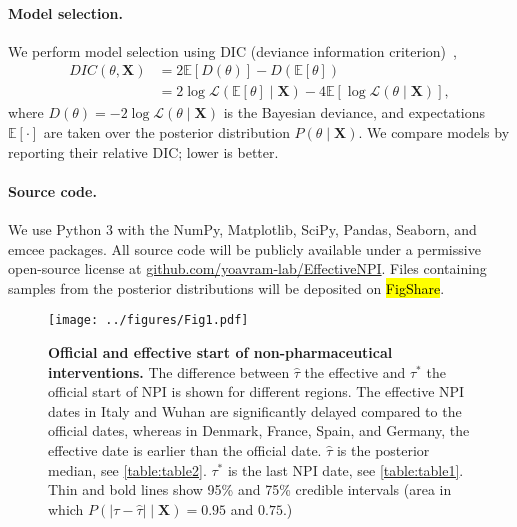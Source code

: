 \documentclass[12pt]{extarticle}
\let\vec\mathbf
\begin{document}
\paragraph*{Model selection.}
We perform model selection using DIC (deviance information criterion)~\citep{Spiegelhalter2002},
\begin{equation} \label{eq:DIC}
\begin{aligned}
DIC(\theta, \vec{X}) &= 2\mathbb{E}[D(\theta)] - D(\mathbb{E}[\theta])   \\
&= 2 \log\mathcal{L}(\mathbb{E}[\theta] \mid \vec{X}) - 4\mathbb{E}[\log\mathcal{L}(\theta \mid \vec{X})],
\end{aligned}
\end{equation}
where $D(\theta)=-2\log\mathcal{L}(\theta \mid \vec{X})$ is the Bayesian deviance, and expectations $\mathbb{E}[\cdot]$ are taken over the posterior distribution $P(\theta \mid \vec{X})$.
We compare models by reporting their relative DIC; lower is better.



\paragraph*{Source code.} 
We use Python 3 with the NumPy, Matplotlib, SciPy, Pandas, Seaborn, and emcee packages.
All source code will be publicly available under a permissive open-source license at \href{http://github.com/yoavram-lab/EffectiveNPI}{github.com/yoavram-lab/EffectiveNPI}.
Files containing samples from the posterior distributions will be deposited on \hl{FigShare}.



\begin{figure}[h]
    \centering
	\texttt{[image: ../figures/Fig1.pdf]}
    \caption{
    \textbf{Official and effective start of non-pharmaceutical interventions.}
    	The difference between $\hat{\tau}$ the effective and $\tau^*$ the official start of NPI is shown for different regions. The effective NPI dates in Italy and Wuhan are significantly delayed compared to the official dates, whereas in Denmark, France, Spain, and Germany, the effective date is earlier than the official date.
	$\hat{\tau}$ is the posterior median, see \autoref{table:table2}. $\tau^*$ is the last NPI date, see \autoref{table:table1}. Thin and bold lines show 95\% and 75\% credible intervals (area in which $P(|\tau - \hat{\tau}| \mid \vec{X}) = 0.95$ and $0.75$.)
    }
    \label{fig:fig1}
\end{figure}
\end{document}
